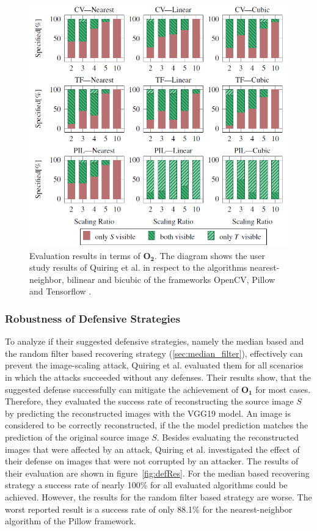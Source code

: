 \documentclass[sigconf]{acmart}
\begin{document}
\begin{figure}[h]
  \centering
  \includegraphics[width=\linewidth]{img/resUserStudy.png}
  \caption{Evaluation results in terms of $\boldsymbol{O_2}$. The diagram shows the user study results of Quiring et al. in respect to the algorithms nearest-neighbor, bilinear and bicubic of the frameworks OpenCV, Pillow and Tensorflow \cite{imgscale}.}
  \Description{}
  \label{fig:results_algos_o2}
\end{figure}

\subsubsection{Robustness of Defensive Strategies}
To analyze if their suggested defensive strategies, namely the median based and the random filter based recovering strategy (\ref{sec:median_filter}), effectively can prevent the image-scaling attack, Quiring et al. evaluated them for all scenarios in which the attacks succeeded without any defenses.
Their results show, that the suggested defense successfully can mitigate the achievement of $\boldsymbol{O_1}$ for most cases.
Therefore, they evaluated the success rate of reconstructing the source image $S$ by predicting the reconstructed images with the VGG19 model.
An image is considered to be correctly reconstructed, if the the model prediction matches the prediction of the original source image $S$.
Besides evaluating the reconstructed images that were affected by an attack, Quiring et al. investigated the effect of their defense on images that were not corrupted by an attacker.
The results of their evaluation are shown in figure~\ref{fig:defRes}.
For the median based recovering strategy a success rate of nearly 100\% for all evaluated algorithms could be achieved.
However, the results for the random filter based strategy are worse.
The worst reported result is a success rate of only 88.1\% for the nearest-neighbor algorithm of the Pillow framework.
\end{document}

